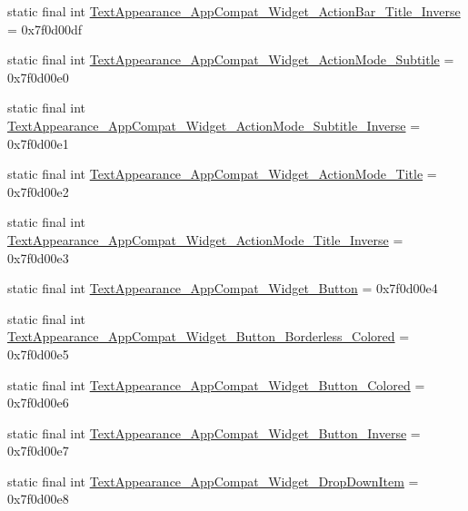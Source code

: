 \begin{DoxyCompactItemize}
static final int \mbox{\hyperlink{classandroid_1_1support_1_1v7_1_1appcompat_1_1_r_1_1style_aae56fc22cd4a5422e5bbd3527cdfbca8}{Text\+Appearance\+\_\+\+App\+Compat\+\_\+\+Widget\+\_\+\+Action\+Bar\+\_\+\+Title\+\_\+\+Inverse}} = 0x7f0d00df
\item 
static final int \mbox{\hyperlink{classandroid_1_1support_1_1v7_1_1appcompat_1_1_r_1_1style_ae80b6fd99f5c558c8631bf51e84be10f}{Text\+Appearance\+\_\+\+App\+Compat\+\_\+\+Widget\+\_\+\+Action\+Mode\+\_\+\+Subtitle}} = 0x7f0d00e0
\item 
static final int \mbox{\hyperlink{classandroid_1_1support_1_1v7_1_1appcompat_1_1_r_1_1style_ace2e9bee4fbb10f73b009e25320c6497}{Text\+Appearance\+\_\+\+App\+Compat\+\_\+\+Widget\+\_\+\+Action\+Mode\+\_\+\+Subtitle\+\_\+\+Inverse}} = 0x7f0d00e1
\item 
static final int \mbox{\hyperlink{classandroid_1_1support_1_1v7_1_1appcompat_1_1_r_1_1style_a8916bfb355f4339b9c42ba1331eb478d}{Text\+Appearance\+\_\+\+App\+Compat\+\_\+\+Widget\+\_\+\+Action\+Mode\+\_\+\+Title}} = 0x7f0d00e2
\item 
static final int \mbox{\hyperlink{classandroid_1_1support_1_1v7_1_1appcompat_1_1_r_1_1style_aac3e1610afd8a4516c6eccd16ee4476f}{Text\+Appearance\+\_\+\+App\+Compat\+\_\+\+Widget\+\_\+\+Action\+Mode\+\_\+\+Title\+\_\+\+Inverse}} = 0x7f0d00e3
\item 
static final int \mbox{\hyperlink{classandroid_1_1support_1_1v7_1_1appcompat_1_1_r_1_1style_a727c66b567829dccd9c00810cf31f225}{Text\+Appearance\+\_\+\+App\+Compat\+\_\+\+Widget\+\_\+\+Button}} = 0x7f0d00e4
\item 
static final int \mbox{\hyperlink{classandroid_1_1support_1_1v7_1_1appcompat_1_1_r_1_1style_a7046ffbded4909cefd30ce237eb1ac8e}{Text\+Appearance\+\_\+\+App\+Compat\+\_\+\+Widget\+\_\+\+Button\+\_\+\+Borderless\+\_\+\+Colored}} = 0x7f0d00e5
\item 
static final int \mbox{\hyperlink{classandroid_1_1support_1_1v7_1_1appcompat_1_1_r_1_1style_a3ee8166f982b74964bde96f9da028b09}{Text\+Appearance\+\_\+\+App\+Compat\+\_\+\+Widget\+\_\+\+Button\+\_\+\+Colored}} = 0x7f0d00e6
\item 
static final int \mbox{\hyperlink{classandroid_1_1support_1_1v7_1_1appcompat_1_1_r_1_1style_ac142dc7e75b7e898146711016297324e}{Text\+Appearance\+\_\+\+App\+Compat\+\_\+\+Widget\+\_\+\+Button\+\_\+\+Inverse}} = 0x7f0d00e7
\item 
static final int \mbox{\hyperlink{classandroid_1_1support_1_1v7_1_1appcompat_1_1_r_1_1style_a324d7ce5b9cf28cccb21d06ec310517e}{Text\+Appearance\+\_\+\+App\+Compat\+\_\+\+Widget\+\_\+\+Drop\+Down\+Item}} = 0x7f0d00e8

\end{DoxyCompactItemize}
